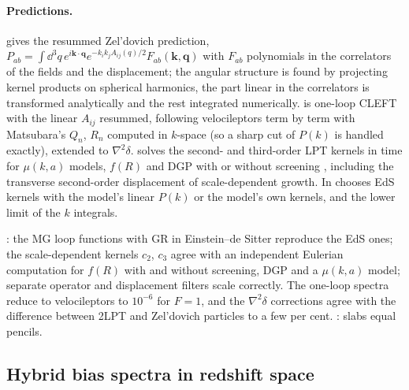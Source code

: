 \paragraph*{Predictions.}  gives the resummed Zel'dovich prediction, $P_{ab}=\int\dd^3q\,e^{i\bm k\cdot\bm q}
e^{-k_ik_jA_{ij}(q)/2}F_{ab}(\bm k,\bm q)$ with $F_{ab}$ polynomials in the correlators of the fields and the displacement; the angular structure is found by
projecting kernel products on spherical harmonics, the part linear in the correlators is transformed analytically and the rest integrated numerically.
 is one-loop CLEFT \cite{Carlson2013,Vlah2016,Chen2020} with the linear $A_{ij}$ resummed, following velocileptors term by term
with Matsubara's $Q_n$, $R_n$ \cite{Matsubara2008} computed in $k$-space (so a sharp cut of $P(k)$ is handled exactly), extended to $\nabla^2\delta$.
 solves the second- and third-order LPT kernels in time for $\mu(k,a)$ models, $f(R)$ and DGP with or without screening
\cite{KoyamaTaruyaHiramatsu2009,Aviles2017}, including the transverse second-order displacement of scale-dependent growth.
In   chooses EdS kernels with the model's linear $P(k)$ or the
model's own kernels, and  the lower limit of the $k$ integrals.

\begin{validation}
: the MG loop functions with GR in Einstein--de Sitter reproduce the EdS ones; the scale-dependent kernels $c_2$, $c_3$ agree
with an independent Eulerian computation for $f(R)$ with and without screening, DGP and a $\mu(k,a)$ model; separate operator and displacement filters scale
correctly. The one-loop spectra reduce to velocileptors to $10^{-6}$ for $F=1$, and the $\nabla^2\delta$ corrections agree with the difference between 2LPT
and Zel'dovich particles to a few per cent. : slabs equal pencils.
\end{validation}

\subsection{Hybrid bias spectra in redshift space}\label{sec:pk-hybrid-rsd}

